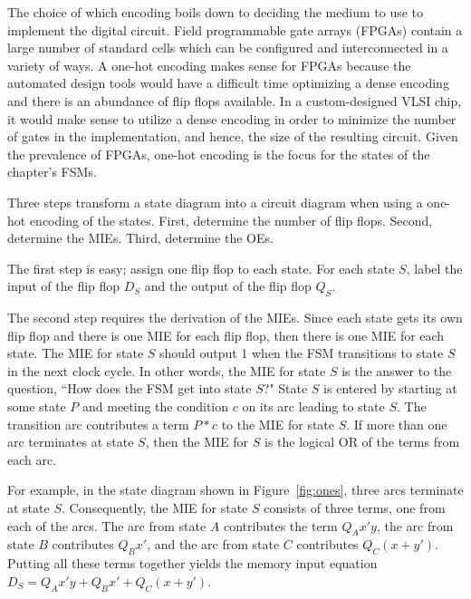 The choice of which encoding boils down to deciding the medium to
use to implement the digital circuit.  Field programmable gate arrays (FPGAs) 
contain a large number of 
standard cells which can be configured and interconnected in a variety of ways.
A one-hot encoding makes sense for FPGAs because the automated design tools 
would have a difficult time optimizing a dense encoding and there is an 
abundance of flip flops available.  In a custom-designed VLSI chip, it would 
make sense to utilize a dense encoding in order to minimize the number of 
gates in the implementation, and hence, the size of the resulting circuit.  
Given the prevalence of FPGAs, 
one-hot encoding is the focus for the states of the chapter's FSMs.

Three steps transform a state diagram into a 
circuit diagram when using a one-hot encoding of the states.  First, 
determine the number of flip flops.  Second, determine the MIEs.
Third, determine the OEs.

The first step is easy; assign one flip flop to each state.  For
each state $S$, label the input of the flip flop $D_S$ and the
output of the flip flop $Q_S$.

The second step requires the derivation of the MIEs.  Since each state
gets its own flip flop and there is one MIE for each flip flop, then there 
is one MIE for each state.  The  MIE for state $S$ should output 1 when the 
FSM transitions to state $S$ in the next clock cycle.  In other words, 
the MIE for state $S$ is the answer to the question, ``How does the FSM get 
into state $S$?"  State $S$ is entered by starting at some state $P$ and 
meeting the condition $c$ on its arc leading to state $S$.  The transition
arc contributes a term $P*c$ to the MIE for state $S$.  If  more 
than one arc terminates at state $S$, then the MIE for $S$ is the logical
OR of the terms from each arc.

For example, in the state diagram shown in Figure~\ref{fig:ones}, three 
arcs terminate at state $S$.  Consequently, the MIE for state $S$ 
consists of three terms, one from each of the arcs.  The arc from state $A$
contributes the term $Q_Ax'y$, the arc from state $B$ contributes $Q_Bx'$,
and the arc from state $C$ contributes $Q_C(x+y')$.  Putting all these terms
together yields the memory input equation $D_S = Q_Ax'y + Q_Bx' + Q_C(x+y')$.

